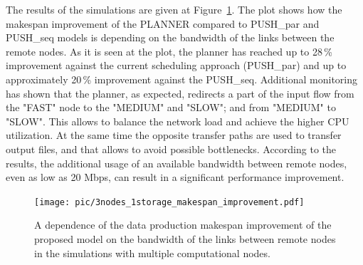 \documentclass{svjour3}                     %
\begin{document}
The results of the simulations are given at Figure~\ref{multi_makespan_compare}. The plot shows how the makespan improvement of the PLANNER compared to PUSH\_par and PUSH\_seq models is depending on the bandwidth of the links between the remote nodes. As it is seen at the plot, the planner has reached up to 28\,\% improvement against the current scheduling approach (PUSH\_par) and up to approximately 20\,\% improvement against the PUSH\_seq. Additional monitoring has shown that the planner, as expected, redirects a part of the input flow from the "FAST" node to the "MEDIUM" and "SLOW"; and from "MEDIUM" to "SLOW". This allows to balance the network load and achieve the higher CPU utilization. At the same time the opposite transfer paths are used to transfer output files, and that allows to avoid possible bottlenecks. According to the results, the additional usage of an available bandwidth between remote nodes, even as low as 20 Mbps, can result in a significant performance improvement.
\begin{figure}
  \begin{center}
    \texttt{[image: pic/3nodes\_1storage\_makespan\_improvement.pdf]}
    \caption{A dependence of the data production makespan improvement of the proposed model on the bandwidth of the links between remote nodes in the simulations with multiple computational nodes. %
    }
      \label{multi_makespan_compare}	
  \end{center}  
\end{figure}
\end{document}
